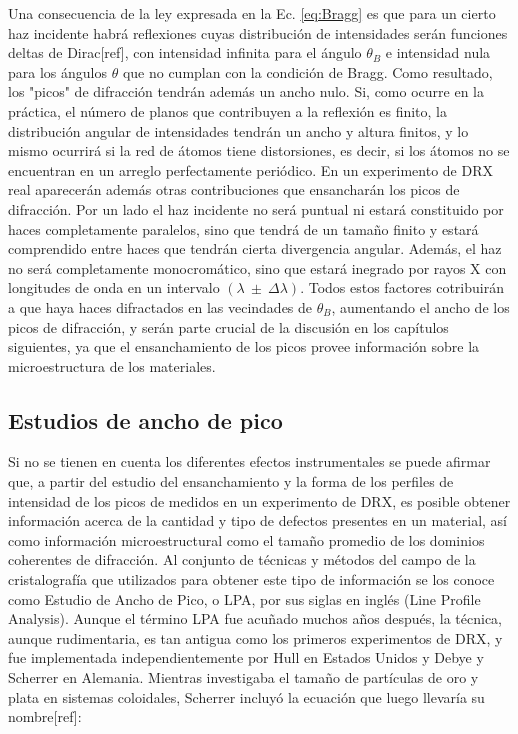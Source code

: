 Una consecuencia de la ley expresada en la Ec. \ref{eq:Bragg} es que para un cierto haz incidente habrá reflexiones cuyas distribución de intensidades serán funciones deltas de Dirac[ref], con intensidad infinita para el ángulo $\theta_{B}$ e intensidad nula para los ángulos $\theta$ que no cumplan con la condición de Bragg. Como resultado, los "picos" de difracción tendrán además un ancho nulo. 
Si, como ocurre en la práctica, el número de planos que contribuyen a la reflexión es finito, la distribución angular de intensidades tendrán un ancho y altura finitos, y lo mismo ocurrirá si la red de átomos tiene distorsiones, es decir, si los átomos no se encuentran en un arreglo perfectamente periódico. 
En un experimento de DRX real aparecerán además otras contribuciones que ensancharán los picos de difracción. 
Por un lado el haz incidente no será puntual ni estará constituido por haces completamente paralelos, sino que tendrá de un tamaño finito y estará comprendido entre haces que tendrán cierta divergencia angular. 
Además, el haz no será completamente monocromático, sino que estará inegrado por rayos X con longitudes de onda en un intervalo $(\lambda \ \pm \ \Delta \lambda)$. 
Todos estos factores cotribuirán a que haya haces difractados en las vecindades de $\theta_{B}$, aumentando el ancho de los picos de difracción, y serán parte crucial de la discusión en los capítulos siguientes, ya que el ensanchamiento de los picos provee información sobre la microestructura de los materiales.

\subsection{Estudios de ancho de pico}\label{SS:DRX-LPA}
Si no se tienen en cuenta los diferentes efectos instrumentales se puede afirmar que, a partir del estudio del ensanchamiento y la forma de los perfiles de intensidad de los picos de medidos en un experimento de DRX, es posible obtener información acerca de la cantidad y tipo de defectos presentes en un material, así como información microestructural como el tamaño promedio de los dominios coherentes de difracción. 
Al conjunto de t\'ecnicas y m\'etodos del campo de la cristalografía que utilizados para obtener este tipo de información se los conoce como Estudio de Ancho de Pico, o LPA, por sus siglas en inglés (Line Profile Analysis).
Aunque el término LPA fue acuñado muchos años después, la técnica, aunque rudimentaria, es tan antigua como los primeros experimentos de DRX, y fue implementada independientemente por Hull en Estados Unidos y Debye y Scherrer en Alemania. Mientras investigaba el tamaño de partículas de oro y plata en sistemas coloidales, Scherrer incluyó la ecuación que luego llevaría su nombre[ref]:

